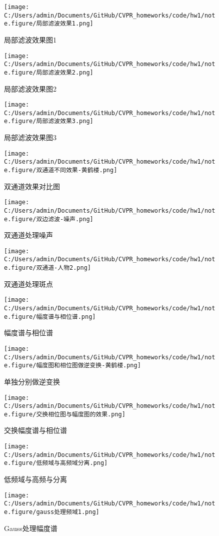 \documentclass[12pt, a4paper, oneside]{ctexart}
\begin{document}
\begin{figure}[htbp]
    \centering
    \texttt{[image: C:/Users/admin/Documents/GitHub/CVPR\_homeworks/code/hw1/note.figure/局部滤波效果1.png]}
    \caption{局部滤波效果图1\label{局部滤波1}}
\end{figure}
\begin{figure}[htbp]
    \centering
    \texttt{[image: C:/Users/admin/Documents/GitHub/CVPR\_homeworks/code/hw1/note.figure/局部滤波效果2.png]}
    \caption{局部滤波效果图2\label{局部滤波2}}
\end{figure}
\begin{figure}[htbp]
    \centering
    \texttt{[image: C:/Users/admin/Documents/GitHub/CVPR\_homeworks/code/hw1/note.figure/局部滤波效果3.png]}
    \caption{局部滤波效果图3\label{局部滤波3}}
\end{figure}
\begin{figure}[htbp]
    \centering
    \texttt{[image: C:/Users/admin/Documents/GitHub/CVPR\_homeworks/code/hw1/note.figure/双通道不同效果-黄鹤楼.png]}
    \caption{双通道效果对比图\label{双通道效果对比图}}
\end{figure}
\begin{figure}[htbp]
    \centering
    \texttt{[image: C:/Users/admin/Documents/GitHub/CVPR\_homeworks/code/hw1/note.figure/双边滤波-噪声.png]}
    \caption{双通道处理噪声\label{双通道处理噪声}}
\end{figure}
\begin{figure}[htbp]
    \centering
    \texttt{[image: C:/Users/admin/Documents/GitHub/CVPR\_homeworks/code/hw1/note.figure/双通道-人物2.png]}
    \caption{双通道处理斑点\label{双通道处理斑点}}
\end{figure}
\begin{figure}[htbp]
    \centering
    \texttt{[image: C:/Users/admin/Documents/GitHub/CVPR\_homeworks/code/hw1/note.figure/幅度谱与相位谱.png]}
    \caption{幅度谱与相位谱\label{幅度谱与相位谱}}
\end{figure}
\begin{figure}[htbp]
    \centering
    \texttt{[image: C:/Users/admin/Documents/GitHub/CVPR\_homeworks/code/hw1/note.figure/幅度图和相位图做逆变换-黄鹤楼.png]}
    \caption{单独分别做逆变换\label{单独分别做逆变换}}
\end{figure}
\begin{figure}[htbp]
    \centering
    \texttt{[image: C:/Users/admin/Documents/GitHub/CVPR\_homeworks/code/hw1/note.figure/交换相位图与幅度图的效果.png]}
    \caption{交换幅度谱与相位谱\label{交换幅度谱与相位谱}}
\end{figure}
\begin{figure}[htbp]
    \centering
    \texttt{[image: C:/Users/admin/Documents/GitHub/CVPR\_homeworks/code/hw1/note.figure/低频域与高频域分离.png]}
    \caption{低频域与高频与分离\label{低频域与高频与分离}}
\end{figure}
\begin{figure}[htbp]
    \centering
    \texttt{[image: C:/Users/admin/Documents/GitHub/CVPR\_homeworks/code/hw1/note.figure/gauss处理频域1.png]}
    \caption{Gauss处理幅度谱\label{Gauss处理幅度谱}}
\end{figure}
\clearpage
\end{document}
